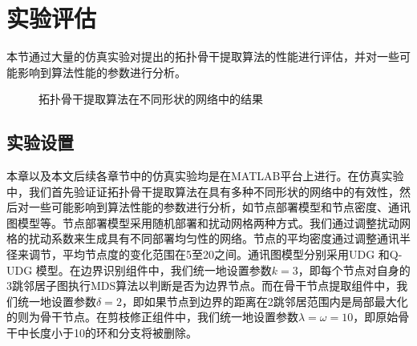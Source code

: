 \section{实验评估}
本节通过大量的仿真实验对提出的拓扑骨干提取算法的性能进行评估，并对一些可能影响到算法性能的参数进行分析。
\begin{figure}[h]
  \centering
  \hspace{0.25em}%
  \hspace{0.25em}%
  \hspace{0.25em}%
  \hspace{0.25em}%
  \hspace{0.25em}%
  \hspace{0.25em}%
  \hspace{0.25em}%
  \hspace{0.25em}%
  \hspace{0.25em}%
  \hspace{0.25em}%
  \hspace{0.25em}%
  \caption{拓扑骨干提取算法在不同形状的网络中的结果}
  \label{fig:307}
\end{figure}
\subsection{实验设置}
本章以及本文后续各章节中的仿真实验均是在MATLAB平台上进行。在仿真实验中，我们首先验证证拓扑骨干提取算法在具有多种不同形状的网络中的有效性，然后对一些可能影响到算法性能的参数进行分析，如节点部署模型和节点密度、通讯图模型等。节点部署模型采用随机部署和扰动网格两种方式。我们通过调整扰动网格的扰动系数来生成具有不同部署均匀性的网络。节点的平均密度通过调整通讯半径来调节，平均节点度的变化范围在5至20之间。通讯图模型分别采用UDG 和Q-UDG 模型。在边界识别组件中，我们统一地设置参数$k=3$，即每个节点对自身的3跳邻居子图执行MDS算法以判断是否为边界节点。而在骨干节点提取组件中，我们统一地设置参数$\delta=2$，即如果节点到边界的距离在2跳邻居范围内是局部最大化的则为骨干节点。在剪枝修正组件中，我们统一地设置参数$\lambda=\omega=10$，即原始骨干中长度小于10的环和分支将被删除。

